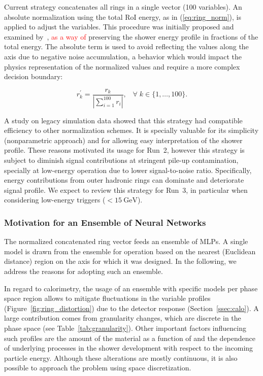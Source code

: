 Current strategy concatenates all rings in a single vector (100
variables). An absolute normalization using the total RoI energy, as in
(\ref{eq:ring_norm}), is applied to adjust the variables. This procedure was
initially proposed and examined by~\cite{1995_seixas_ringer}, \textcolor{red}{as a way of}
preserving the shower energy profile in fractions of the total energy. The
absolute term is used to avoid reflecting the values along the axis due to
negative noise accumulation, a behavior which would impact the physics
representation of the normalized values and require a more complex decision
boundary:

\begin{equation}
  r^\prime_{k} = \frac{r_{k}}{| \sum\limits_{i=1}^{100} r_i
  |}, \;\;\;
    \forall \; k\in\{1,\dots,100\}.
\label{eq:ring_norm}
\end{equation}

A study on legacy simulation data showed that this strategy had compatible
efficiency to other normalization schemes. It is specially valuable for its
simplicity (nonparametric approach) and for allowing easy interpretation of the
shower profile. These reasons motivated its usage for Run~2, however this
strategy is subject to diminish signal contributions at stringent pile-up
contamination, specially at low-energy operation due to lower signal-to-noise
ratio.  Specifically, energy contributions from outer hadronic rings can
dominate and deteriorate signal profile. We expect to review this strategy for
Run~3, in particular when considering low-energy triggers ($<\SI{15}{\GeV}$).

\subsubsection{Motivation for an Ensemble of Neural Networks}\label{top:nn_ensemble}

The normalized concatenated ring vector feeds an ensemble of MLPs. A single
model is drawn from the ensemble for operation based on the nearest (Euclidean
distance) region on the \eteta axis for which it was designed. In the following, we address
the reasons for adopting such an ensemble.

In regard to calorimetry, the usage of an ensemble with specific models per
phase space region allows to mitigate fluctuations in the variable profiles
(Figure~\ref{fig:ring_distortion}) due to the detector response
(Section~\ref{ssec:calo}). %
A large contribution comes from granularity changes, which are discrete
in the phase space (see Table~\ref{tab:granularity}). Other important factors 
influencing such profiles are the
amount of the material as a function of \abseta{} and the dependence of
underlying processes in the shower development with respect to the incoming
particle energy. Although these alterations are mostly continuous, it is also
possible to approach the problem using space discretization.

